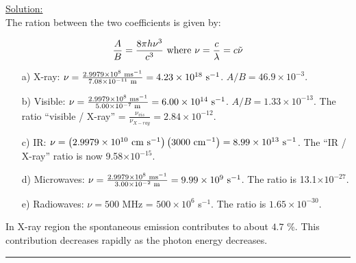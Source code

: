\noindent
\underline{Solution:}\\

\noindent
The ration between the two coefficients is given by:

$$\frac{A}{B} = \frac{8\pi h\nu^3}{c^3}\textnormal{ where }\nu = \frac{c}{\lambda} = c\tilde{\nu}$$

\begin{itemize}

\item[a)] X-ray: $\nu = \frac{2.9979\times 10^8\textnormal{ ms}^{-1}}{7.08\times 10^{-11}\textnormal{ m}} = 4.23\times 10^{18}\textnormal{ s}^{-1}$. $A/B = 46.9\times 10^{-3}$.

\item[b)] Visible: $\nu = \frac{2.9979\times 10^8\textnormal{ ms}^{-1}}{5.00\times10^{-7}\textnormal{ m}} = 6.00\times10^{14}\textnormal{ s}^{-1}$. $A/B = 1.33\times 10^{-13}$. The ratio ``visible / X-ray'' = $\frac{\nu_{vis}}{\nu_{X-ray}} = 2.84\times 10^{-12}$.

\item[c)] IR: $\nu = \left(2.9979\times 10^{10}\textnormal{ cm s}^{-1}\right)\left(3000\textnormal{ cm}^{-1}\right) = 8.99\times 10^{13}\textnormal{ s}^{-1}$. The ``IR / X-ray'' ratio is now 9.58$\times 10^{-15}$.

\item[d)] Microwaves: $\nu = \frac{2.9979\times 10^8\textnormal{ ms}^{-1}}{3.00\times 10^{-2}\textnormal{ m}} = 9.99\times 10^9\textnormal{ s}^{-1}$. The ratio is 13.1$\times 10^{-27}$.

\item[e)] Radiowaves: $\nu = 500$ MHz = $500\times 10^6$ s$^{-1}$. The ratio is $1.65\times 10^{-30}$.

\end{itemize}

\noindent
In X-ray region the spontaneous emission contributes to about $4.7$ \%. This contribution decreases rapidly as the photon energy decreases.

\hrule\vspace{0.5cm}



